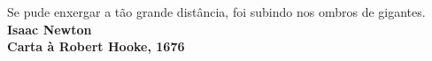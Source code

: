 \begin{epigrafe}
    \vspace*{\fill}
	\begin{flushright}
		Se pude enxergar a tão grande distância, foi subindo nos ombros de gigantes.\\
		 \vspace{\baselineskip}
		\textbf{Isaac Newton}\\
		\textbf{Carta à Robert Hooke, 1676}
	\end{flushright}
\end{epigrafe}